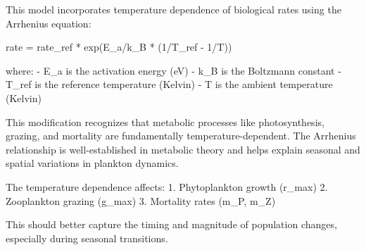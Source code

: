 This model incorporates temperature dependence of biological rates using the Arrhenius equation:

rate = rate_ref * exp(E_a/k_B * (1/T_ref - 1/T))

where:
- E_a is the activation energy (eV)
- k_B is the Boltzmann constant
- T_ref is the reference temperature (Kelvin)
- T is the ambient temperature (Kelvin)

This modification recognizes that metabolic processes like photosynthesis, grazing, and mortality are fundamentally temperature-dependent. The Arrhenius relationship is well-established in metabolic theory and helps explain seasonal and spatial variations in plankton dynamics.

The temperature dependence affects:
1. Phytoplankton growth (r_max)
2. Zooplankton grazing (g_max)
3. Mortality rates (m_P, m_Z)

This should better capture the timing and magnitude of population changes, especially during seasonal transitions.
